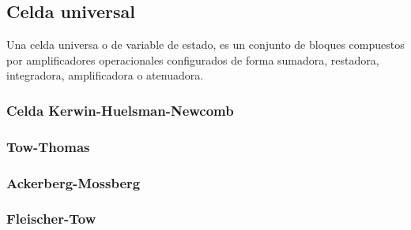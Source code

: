 



\subsection{Celda universal}
Una celda universa o de variable de estado, es un conjunto de bloques compuestos por amplificadores operacionales configurados de forma sumadora, restadora, integradora, amplificadora o atenuadora.

\subsubsection{Celda Kerwin-Huelsman-Newcomb}

\subsubsection{Tow-Thomas}

\subsubsection{Ackerberg-Mossberg}

\subsubsection{Fleischer-Tow}


